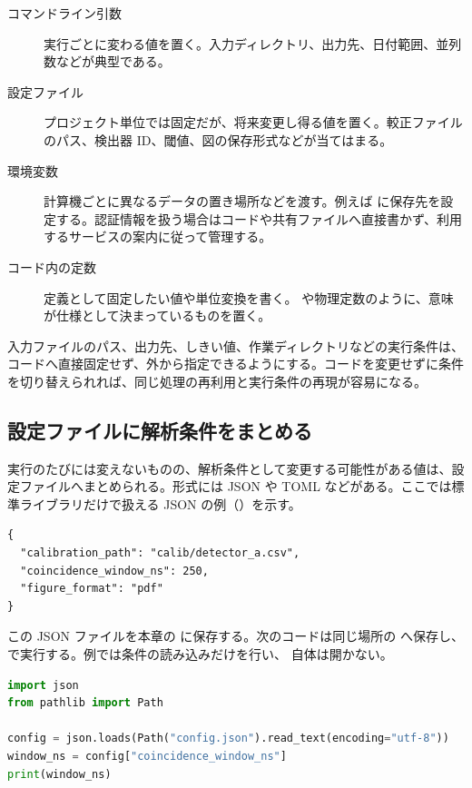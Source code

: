 \begin{description}
\item[コマンドライン引数] 実行ごとに変わる値を置く。入力ディレクトリ、出力先、日付範囲、並列数などが典型である。
\item[設定ファイル] プロジェクト単位では固定だが、将来変更し得る値を置く。較正ファイルのパス、検出器 ID、閾値、図の保存形式などが当てはまる。
\item[環境変数] 計算機ごとに異なるデータの置き場所などを渡す。例えば  に保存先を設定する。認証情報を扱う場合はコードや共有ファイルへ直接書かず、利用するサービスの案内に従って管理する。
\item[コード内の定数] 定義として固定したい値や単位変換を書く。 や物理定数のように、意味が仕様として決まっているものを置く。
\end{description}

入力ファイルのパス、出力先、しきい値、作業ディレクトリなどの実行条件は、コードへ直接固定せず、外から指定できるようにする。コードを変更せずに条件を切り替えられれば、同じ処理の再利用と実行条件の再現が容易になる。

\subsection{設定ファイルに解析条件をまとめる}

実行のたびには変えないものの、解析条件として変更する可能性がある値は、設定ファイルへまとめられる。形式には JSON や TOML などがある。ここでは標準ライブラリだけで扱える JSON の例（）を示す。

\begin{lstlisting}[numbers=none, xleftmargin=2\zw, title={config.json}]
{
  "calibration_path": "calib/detector_a.csv",
  "coincidence_window_ns": 250,
  "figure_format": "pdf"
}
\end{lstlisting}

この JSON ファイルを本章の  に保存する。次のコードは同じ場所の  へ保存し、 で実行する。例では条件の読み込みだけを行い、 自体は開かない。

\begin{lstlisting}[language=Python]
import json
from pathlib import Path

config = json.loads(Path("config.json").read_text(encoding="utf-8"))
window_ns = config["coincidence_window_ns"]
print(window_ns)
\end{lstlisting}

